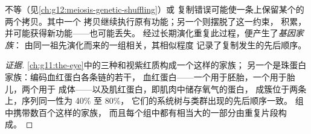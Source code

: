 \begin{proposition}[基因复制与分化]\label{prop:g12:diversification-of-life:duplication}
不等（见\cref{ch:g12:meiosis-genetic-shuffling}）或
复制错误可能使一条上保留某个的两个拷贝。其中一个
拷贝继续执行原有功能；另一个则摆脱了这一约束，
积累，并可能获得新功能——也可能丢失。
经过长期演化重复此过程，便产生了\emph{基因家族}：
由同一祖先演化而来的一组相关，其相似程度
记录了复制发生的先后顺序。
\end{proposition}
\begin{proof}[证据]
\cref{ch:g11:the-eye}中的三种和视紫红质构成一个这样的家族；
另一个是珠蛋白家族：编码血红蛋白各条链的若干，
血红蛋白——一个用于胚胎，一个用于胎儿，两个用于
成体——以及肌红蛋白，即肌肉中储存氧气的蛋白，
成簇位于两条上，序列同一性为 40\% 至 80\%，
它们的系统树与类群出现的先后顺序一致。
组中携带数百个这样的家族，
而且每个组中都有相当大的一部分由重复片段构成。
\end{proof}

